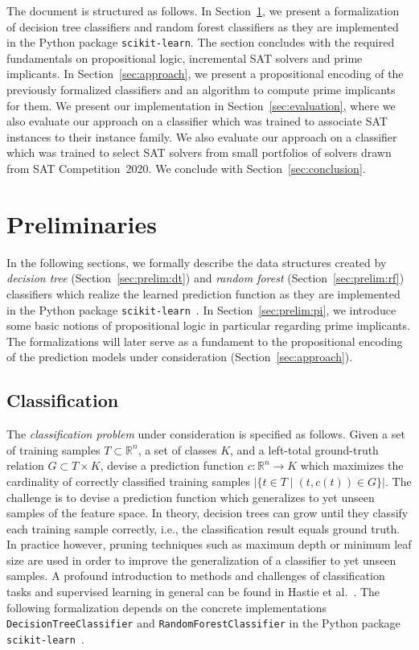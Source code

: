 \documentclass[a4paper, USenglish, cleveref, autoref, thm-restate]{lipics-v2021}
\theoremstyle{definition}
\begin{document}
The document is structured as follows. 
In Section~\ref{sec:prelim}, we present a formalization of decision tree classifiers and random forest classifiers as they are implemented in the Python package \verb!scikit-learn!. 
The section concludes with the required fundamentals on propositional logic, incremental SAT solvers and prime implicants. 
In Section~\ref{sec:approach}, we present a propositional encoding of the previously formalized classifiers and an algorithm to compute prime implicants for them. 
We present our implementation in Section~\ref{sec:evaluation}, where we also evaluate our approach on a classifier which was trained to associate SAT instances to their instance family. 
We also evaluate our approach on a classifier which was trained to select SAT solvers from small portfolios of solvers drawn from SAT Competition~2020. 
We conclude with Section~\ref{sec:conclusion}. 


\section{Preliminaries}
\label{sec:prelim}

In the following sections, we formally describe the data structures created by \emph{decision tree} (Section~\ref{sec:prelim:dt}) and \emph{random forest} (Section~\ref{sec:prelim:rf}) classifiers which realize the learned prediction function as they are implemented in the Python package \verb!scikit-learn!~\cite{Pedregosa:2011:Scikit}. 
In Section~\ref{sec:prelim:pi}, we introduce some basic notions of propositional logic in particular regarding prime implicants. 
The formalizations will later serve as a fundament to the propositional encoding of the prediction models under consideration (Section~\ref{sec:approach}). 

\subsection{Classification}
\label{sec:prelim:classification}

The \emph{classification problem} under consideration is specified as follows. 
Given a set of training samples $T \subset \mathbb{R}^n$, a set of classes $K$, and a left-total ground-truth relation $G \subset T \times K$, devise a prediction function $c : \mathbb{R}^n \rightarrow K$ which maximizes the cardinality of correctly classified training samples $\bigl|\{ t \in T \mid (t, c(t)) \in G \}\bigr|$. 
The challenge is to devise a prediction function which generalizes to yet unseen samples of the feature space. 
In theory, decision trees can grow until they classify each training sample correctly, i.e., the classification result equals ground truth. 
In practice however, pruning techniques such as maximum depth or minimum leaf size are used in order to improve the generalization of a classifier to yet unseen samples. 
A profound introduction to methods and challenges of classification tasks and supervised learning in general can be found in Hastie et al.~\cite{Hastie:2009}. 
The following formalization depends on the concrete implementations \verb!DecisionTreeClassifier! and \verb!RandomForestClassifier! in the Python package \verb!scikit-learn!~\cite{Pedregosa:2011:Scikit}.
\end{document}
